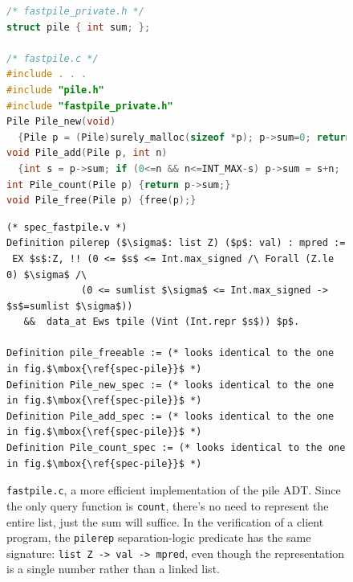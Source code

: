 \documentclass[runningheads,orivec]{llncs}
\begin{document}
\begin{figure}[t]
\begin{lstlisting}[language=C]
/* fastpile_private.h */
struct pile { int sum; };

/* fastpile.c */
#include . . . 
#include "pile.h"
#include "fastpile_private.h"
Pile Pile_new(void)
  {Pile p = (Pile)surely_malloc(sizeof *p); p->sum=0; return p; }
void Pile_add(Pile p, int n)
  {int s = p->sum; if (0<=n && n<=INT_MAX-s) p->sum = s+n; }
int Pile_count(Pile p) {return p->sum;}
void Pile_free(Pile p) {free(p);}
\end{lstlisting}

\begin{lstlisting}[language=coq]
(* spec_fastpile.v *)
Definition pilerep ($\sigma$: list Z) ($p$: val) : mpred :=
 EX $s$:Z, !! (0 <= $s$ <= Int.max_signed /\ Forall (Z.le 0) $\sigma$ /\
             (0 <= sumlist $\sigma$ <= Int.max_signed -> $s$=sumlist $\sigma$))
   &&  data_at Ews tpile (Vint (Int.repr $s$)) $p$.

Definition pile_freeable := (* looks identical to the one in fig.$\mbox{\ref{spec-pile}}$ *)
Definition Pile_new_spec := (* looks identical to the one in fig.$\mbox{\ref{spec-pile}}$ *)
Definition Pile_add_spec := (* looks identical to the one in fig.$\mbox{\ref{spec-pile}}$ *)
Definition Pile_count_spec := (* looks identical to the one in fig.$\mbox{\ref{spec-pile}}$ *)
\end{lstlisting}
\caption{\label{fig-fastpile}\lstinline{fastpile.c}, a more efficient implementation
  of the pile ADT.  Since the only query function is \lstinline{count},
  there's no need to represent the entire list, just the sum will suffice.
  In the verification of a client program, the
  \lstinline{pilerep} separation-logic predicate has the same
  signature: \lstinline{list Z -> val -> mpred},
  even though the representation is a single number rather than
  a linked list.
}
\end{figure}
\end{document}
